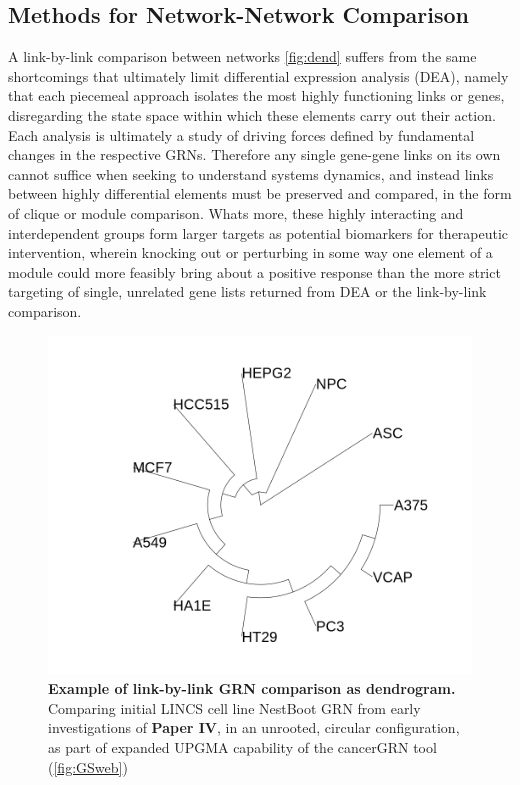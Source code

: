\subsection{Methods for Network-Network Comparison}
\label{sec:net_com}
A link-by-link comparison between networks \cref{fig:dend} suffers from the same shortcomings that ultimately limit differential expression analysis (DEA), namely that each piecemeal approach isolates the most highly functioning links or genes, disregarding the state space within which these elements carry out their action. Each analysis is ultimately a study of driving forces defined by fundamental changes in the respective GRNs. Therefore any single gene-gene links on its own cannot suffice when seeking to understand systems dynamics, and instead links between highly differential elements must be preserved and compared, in the form of clique or module comparison. Whats more, these highly interacting and interdependent groups form larger targets as potential biomarkers for therapeutic intervention, wherein knocking out or perturbing in some way one element of a module could more feasibly bring about a positive response than the more strict targeting of single, unrelated gene lists returned from DEA or the link-by-link comparison.

\begin{figure}
\centering
\includegraphics[width=.75\linewidth]{4/dend.png}
\caption{\textbf{Example of link-by-link GRN comparison as dendrogram.} Comparing initial LINCS cell line NestBoot GRN from early investigations of \textbf{Paper IV}, in an unrooted, circular configuration, as part of expanded UPGMA capability of the cancerGRN tool (\cref{fig:GSweb})}%
\label{fig:UPGMA}%
\end{figure}


